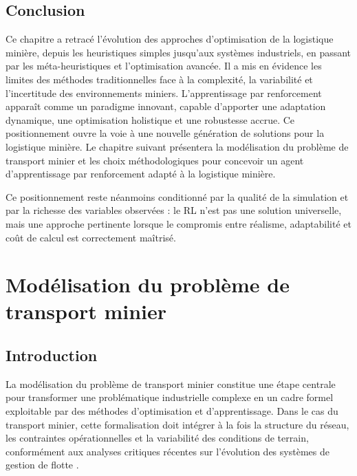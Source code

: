 \documentclass[11pt,a4paper]{report}
\begin{document}
\section{Conclusion}
\label{sec:conclusion-etat-art}

Ce chapitre a retracé l’évolution des approches d’optimisation de la logistique minière, depuis les heuristiques simples jusqu’aux systèmes industriels, en passant par les méta-heuristiques et l’optimisation avancée. Il a mis en évidence les limites des méthodes traditionnelles face à la complexité, la variabilité et l’incertitude des environnements miniers. L'apprentissage par renforcement apparaît comme un paradigme innovant, capable d’apporter une adaptation dynamique, une optimisation holistique et une robustesse accrue. Ce positionnement ouvre la voie à une nouvelle génération de solutions pour la logistique minière. Le chapitre suivant présentera la modélisation du problème de transport minier et les choix méthodologiques pour concevoir un agent d'apprentissage par renforcement adapté à la logistique minière.

Ce positionnement reste néanmoins conditionné par la qualité de la simulation et par la richesse des variables observées : le RL n'est pas une solution universelle, mais une approche pertinente lorsque le compromis entre réalisme, adaptabilité et coût de calcul est correctement maîtrisé.

\chapter{Modélisation du problème de transport minier}
\label{chap:modelisation}

\section*{Introduction}

La modélisation du problème de transport minier constitue une étape centrale pour transformer une problématique industrielle complexe en un cadre formel exploitable par des méthodes d'optimisation et d'apprentissage. Dans le cas du transport minier, cette formalisation doit intégrer à la fois la structure du réseau, les contraintes opérationnelles et la variabilité des conditions de terrain, conformément aux analyses critiques récentes sur l'évolution des systèmes de gestion de flotte \cite{Afrapoli2017, HazrathosseiniAfrapoli2024}.
\end{document}
